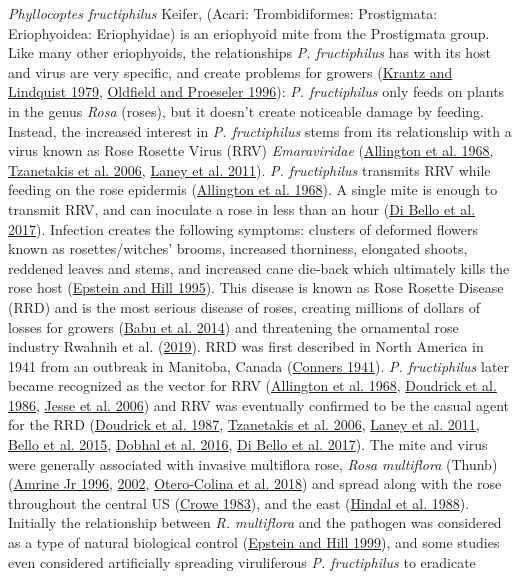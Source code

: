 \documentclass{ufdissertation}[overrideChapters] %
\begin{document}
{\emph{Phyllocoptes fructiphilus} Keifer, (Acari: Trombidiformes: Prostigmata: Eriophyoidea: Eriophyidae) is an eriophyoid mite from the Prostigmata group. Like many other eriophyoids, the relationships \emph{P. fructiphilus} has with its host and virus are very specific, and create problems for growers (\protect\hyperlink{ref-Krantz1979}{Krantz and Lindquist 1979}, \protect\hyperlink{ref-Oldfield1996a}{Oldfield and Proeseler 1996}): \emph{P. fructiphilus} only feeds on plants in the genus \emph{Rosa} (roses), but it doesn't create noticeable damage by feeding. Instead, the increased interest in \emph{P. fructiphilus} stems from its relationship with a virus known as Rose Rosette Virus (RRV) \emph{Emaraviridae} (\protect\hyperlink{ref-Allington1968}{Allington et al. 1968}, \protect\hyperlink{ref-Tzanetakis2006}{Tzanetakis et al. 2006}, \protect\hyperlink{ref-Laney2011}{Laney et al. 2011}). \emph{P. fructiphilus} transmits RRV while feeding on the rose epidermis (\protect\hyperlink{ref-Allington1968}{Allington et al. 1968}). A single mite is enough to transmit RRV, and can inoculate a rose in less than an hour (\protect\hyperlink{ref-Bello2017}{Di Bello et al. 2017}). Infection creates the following symptoms: clusters of deformed flowers known as rosettes/witches' brooms, increased thorniness, elongated shoots, reddened leaves and stems, and increased cane die-back which ultimately kills the rose host (\protect\hyperlink{ref-Epstein1995}{Epstein and Hill 1995}). This disease is known as Rose Rosette Disease (RRD) and is the most serious disease of roses, creating millions of dollars of losses for growers (\protect\hyperlink{ref-Babu2014}{Babu et al. 2014}) and threatening the ornamental rose industry Rwahnih et al. (\protect\hyperlink{ref-Rwahnih2019}{2019}). RRD was first described in North America in 1941 from an outbreak in Manitoba, Canada (\protect\hyperlink{ref-Conners1941}{Conners 1941}). \emph{P. fructiphilus} later became recognized as the vector for RRV (\protect\hyperlink{ref-Allington1968}{Allington et al. 1968}, \protect\hyperlink{ref-Doudrick1986}{Doudrick et al. 1986}, \protect\hyperlink{ref-Jesse2006}{Jesse et al. 2006}) and RRV was eventually confirmed to be the casual agent for the RRD (\protect\hyperlink{ref-Doudrick1987}{Doudrick et al. 1987}, \protect\hyperlink{ref-Tzanetakis2006}{Tzanetakis et al. 2006}, \protect\hyperlink{ref-Laney2011}{Laney et al. 2011}, \protect\hyperlink{ref-Bello2015}{Bello et al. 2015}, \protect\hyperlink{ref-Dobhal2016}{Dobhal et al. 2016}, \protect\hyperlink{ref-Bello2017}{Di Bello et al. 2017}). The mite and virus were generally associated with invasive multiflora rose, \emph{Rosa multiflora} (Thunb) (\protect\hyperlink{ref-Amrine1996}{Amrine Jr 1996}, \protect\hyperlink{ref-Amrine2002}{2002}, \protect\hyperlink{ref-Otero-Colina2018}{Otero-Colina et al. 2018}) and spread along with the rose throughout the central US (\protect\hyperlink{ref-Crowe1983}{Crowe 1983}), and the east (\protect\hyperlink{ref-Hindal1988}{Hindal et al. 1988}). Initially the relationship between \emph{R. multiflora} and the pathogen was considered as a type of natural biological control (\protect\hyperlink{ref-Epstein1999}{Epstein and Hill 1999}), and some studies even considered artificially spreading viruliferous \emph{P. fructiphilus} to eradicate }
\end{document}
